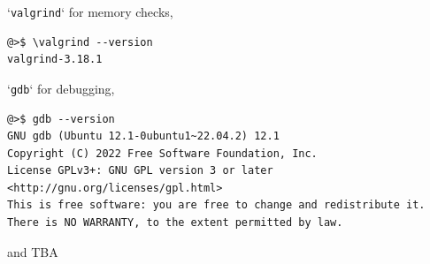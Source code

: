 \documentclass[11pt,a4paper]{report}
\theoremstyle{definitionstyle}
\begin{document}
\begin{itemize}
`\texttt{valgrind}` for memory checks, 
\begin{lstlisting}[numbers=none]
@>$ \valgrind --version
valgrind-3.18.1
\end{lstlisting}

`\texttt{gdb}` for debugging, 	
\begin{lstlisting}[numbers=none]
@>$ gdb --version 
GNU gdb (Ubuntu 12.1-0ubuntu1~22.04.2) 12.1
Copyright (C) 2022 Free Software Foundation, Inc.
License GPLv3+: GNU GPL version 3 or later <http://gnu.org/licenses/gpl.html>
This is free software: you are free to change and redistribute it.
There is NO WARRANTY, to the extent permitted by law.
\end{lstlisting}

and TBA
%

\end{itemize}
%
%
%
%
%
\end{document}
